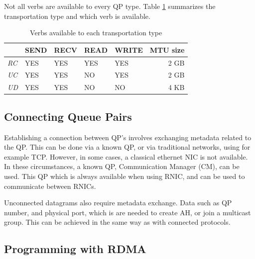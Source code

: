 Not all verbs are available to every QP type.
Table \ref{tab:transport-verb} summarizes the transportation type and which verb is available.

\begin{table}
    \centering
    \begin{tabular}{lllllr}
        \toprule
          & \textbf{SEND} & \textbf{RECV} & \textbf{READ} & \textbf{WRITE} & \textbf{MTU size} \\
        \midrule
        \textit{RC} & YES & YES & YES & YES & 2 GB \\
        \textit{UC} & YES & YES & NO & YES & 2 GB \\
        \textit{UD} & YES & YES & NO & NO & 4 KB \\
        \bottomrule
    \end{tabular}
    \caption{Verbs available to each transportation type}
    \label{tab:transport-verb}
\end{table}

\subsection{Connecting Queue Pairs}\label{subsec:connecting-qp's}
Establishing a connection between QP's involves exchanging metadata related to the QP.
This can be done via a known QP, or via traditional networks, using for example TCP.
However, in some cases, a classical ethernet NIC is not available.
In these circumstances, a known QP, Communication Manager (CM), can be used.
This QP which is always available when using RNIC, and can be used to communicate between RNICs.

Unconnected datagrams also require metadata exchange.
Data such as QP number, and physical port, which is are needed to create AH, or join a multicast group.
This can be achieved in the same way as with connected protocols.

\subsection{Programming with RDMA}\label{subsec:programming-with-rdma}

